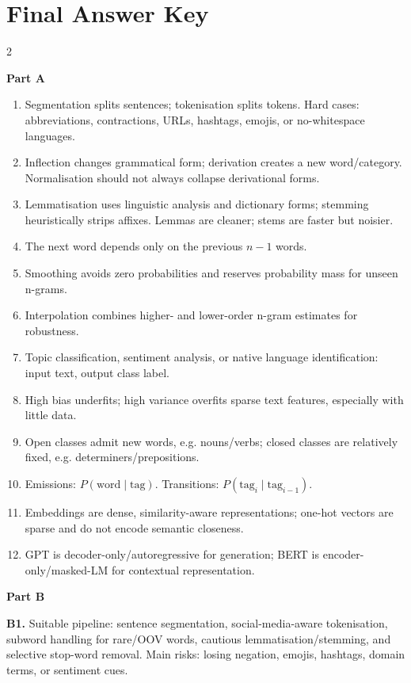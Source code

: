 \documentclass[11pt,a4paper]{article}
\begin{document}
\section*{Final Answer Key}
\thispagestyle{fancy}
\enlargethispage{2\baselineskip}
\scriptsize
\setlength{\parskip}{0.18em}
\begin{multicols}{2}

\textbf{Part A}
\begin{enumerate}[leftmargin=1.2em,itemsep=0.15em]
\item Segmentation splits sentences; tokenisation splits tokens. Hard cases: abbreviations, contractions, URLs, hashtags, emojis, or no-whitespace languages.
\item Inflection changes grammatical form; derivation creates a new word/category. Normalisation should not always collapse derivational forms.
\item Lemmatisation uses linguistic analysis and dictionary forms; stemming heuristically strips affixes. Lemmas are cleaner; stems are faster but noisier.
\item The next word depends only on the previous \(n-1\) words.
\item Smoothing avoids zero probabilities and reserves probability mass for unseen n-grams.
\item Interpolation combines higher- and lower-order n-gram estimates for robustness.
\item Topic classification, sentiment analysis, or native language identification: input text, output class label.
\item High bias underfits; high variance overfits sparse text features, especially with little data.
\item Open classes admit new words, e.g. nouns/verbs; closed classes are relatively fixed, e.g. determiners/prepositions.
\item Emissions: \(P(\text{word}\mid\text{tag})\). Transitions: \(P(\text{tag}_i\mid\text{tag}_{i-1})\).
\item Embeddings are dense, similarity-aware representations; one-hot vectors are sparse and do not encode semantic closeness.
\item GPT is decoder-only/autoregressive for generation; BERT is encoder-only/masked-LM for contextual representation.
\end{enumerate}

\textbf{Part B}

\textbf{B1.} Suitable pipeline: sentence segmentation, social-media-aware tokenisation, subword handling for rare/OOV words, cautious lemmatisation/stemming, and selective stop-word removal. Main risks: losing negation, emojis, hashtags, domain terms, or sentiment cues.


\end{multicols}
\end{document}
